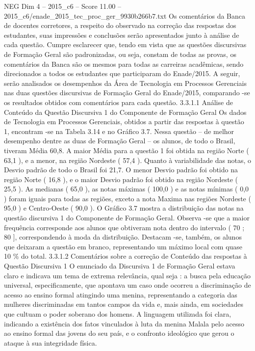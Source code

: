 \begin{textsample}{NEG Dim 4 – 2015\_c6 – Score 11.00 – 2015\_c6/enade\_2015\_tec\_proc\_ger\_9930b266b7.txt}
Os comentários da Banca de docentes corretores, a respeito do observado na correção das respostas dos estudantes, suas impressões e conclusões serão apresentados junto à análise de cada questão.
Cumpre esclarecer que, tendo em vista que as questões discursivas de Formação Geral são padronizadas, ou seja, constam de todas as provas, os comentários da Banca são os mesmos para todas as carreiras acadêmicas, sendo direcionados a todos os estudantes que participaram do Enade/2015.
A seguir, serão analisados os desempenhos da Área de Tecnologia em Processos Gerenciais nas duas questões discursivas de Formação Geral do Enade/2015, comparando -se os resultados obtidos com comentários para cada questão. 3.3.1.1 Análise de Conteúdo da Questão Discursiva 1 do Componente de Formação Geral Os dados de Tecnologia em Processos Gerenciais, obtidos a partir das respostas à questão 1, encontram -se na Tabela 3.14 e no Gráfico 3.7.
Nessa questão – de melhor desempenho dentre as duas de Formação Geral – os alunos, de todo o Brasil, tiveram Média 60,8.
A maior Média para a questão 1 foi obtida na região Norte ( 63,1 ), e a menor, na região Nordeste ( 57,4 ).
Quanto à variabilidade das notas, o Desvio padrão de todo o Brasil foi 21,7.
O menor Desvio padrão foi obtido na região Norte ( 16,8 ), e o maior Desvio padrão foi obtido na região Nordeste ( 25,5 ).
As medianas ( 65,0 ), as notas máximas ( 100,0 ) e as notas mínimas ( 0,0 ) foram iguais para todas as regiões, exceto a nota Maxima nas regiões Nordeste ( 95,0 ) e Centro-Oeste ( 90,0 ).
O Gráfico 3.7 mostra a distribuição das notas na questão discursiva 1 do Componente de Formação Geral.
Observa -se que a maior frequência corresponde aos alunos que obtiveram nota dentro do intervalo ( 70 ; 80 ], correspondendo à moda da distribuição.
Destacam -se, também, os alunos que deixaram a questão em branco, representando um máximo local com quase 10 \% do total. 3.3.1.2 Comentários sobre a correção de Conteúdo das respostas à Questão Discursiva 1 O enunciado da Discursiva 1 de Formação Geral estava claro e indicava um tema de extrema relevância, qual seja : a busca pela educação universal, especificamente, que apontava um caso onde ocorreu a discriminação de acesso ao ensino formal atingindo uma menina, representando a categoria das mulheres discriminadas em tantos campos da vida e, mais ainda, em sociedades que cultuam o poder soberano dos homens.
A linguagem utilizada foi clara, indicando a existência dos fatos vinculados à luta da menina Malala pelo acesso ao ensino formal das jovens do seu país, e o confronto ideológico que gerou o ataque à sua integridade física.

\end{textsample}
